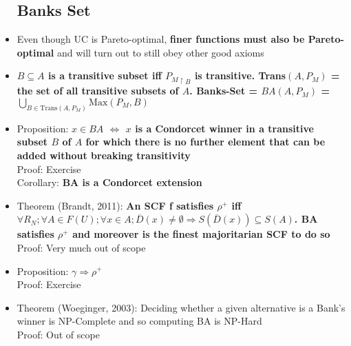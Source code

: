 \documentclass[20pt,a4paper,landscape]{extarticle}
\begin{document}
\begin{flushleft}
\begin{itemize}
\subsection{Banks Set}
\item Even though UC is Pareto-optimal, \textbf{finer functions must also be Pareto-optimal} and will turn out to still obey other good axioms
\item \textbf{$B \subseteq A$ is a transitive subset iff ${P_M}_{\restriction B}$ is transitive. Trans$(A, P_M)$ = the set of all transitive subsets of $A$. Banks-Set = $BA(A, P_M)$ = $\bigcup_{B \in \textrm{Trans}(A, P_M)} \textrm{Max}(P_M, B)$}
\item Proposition: \textbf{$x \in BA$ $\Leftrightarrow$ $x$ is a Condorcet winner in a transitive subset $B$ of $A$ for which there is no further element that can be added without breaking transitivity}\\
Proof: Exercise\\
Corollary: \textbf{BA is a Condorcet extension}
\item Theorem (Brandt, 2011): \textbf{An SCF f satisfies $\rho^+$ iff $\forall R_N; \forall A \in F(U); \forall x \in A; \overline{D}(x) \neq \emptyset \Rightarrow S(\overline{D}(x)) \subseteq S(A)$. BA satisfies $\rho^+$ and moreover is the finest majoritarian SCF to do so}\\
Proof: Very much out of scope
\item Proposition: $\gamma \Rightarrow \rho^+$\\
Proof: Exercise
\item Theorem (Woeginger, 2003): Deciding whether a given alternative is a Bank's winner is NP-Complete and so computing BA is NP-Hard\\
Proof: Out of scope
\end{itemize}

\end{flushleft}
\end{document}
